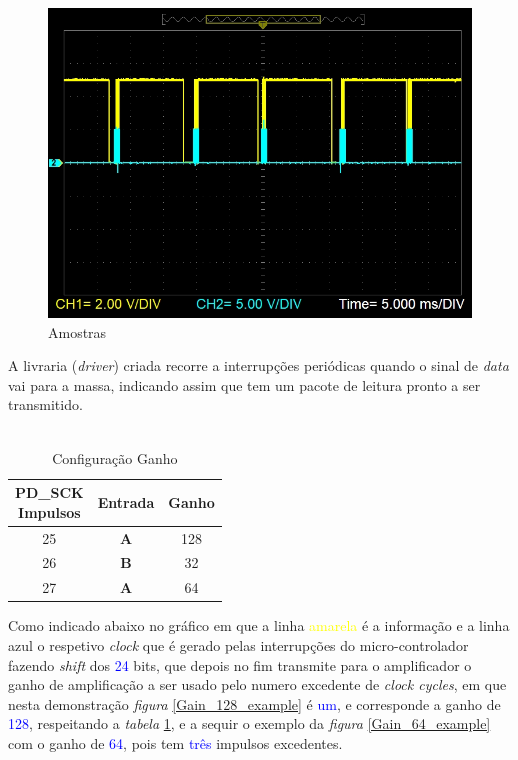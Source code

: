 \begin{figure}[H]
	\centering
	\includegraphics[scale=0.55]{./image/PESTA/graph/80SPS64GAIN/SPS_80.JPG}
	\caption{Amostras}
	\label{SPS_64}
\end{figure}
A livraria (\textit{driver}) criada recorre a interrupções periódicas quando o sinal de \textit{data} vai para a massa, indicando assim que tem um pacote de leitura pronto a ser transmitido.
\\
\\
\begin{minipage}[!b]{.40\linewidth}
	\begin{table}[H]
		\captionsetup{justification=raggedright,singlelinecheck=false}
		\caption{Configuração Ganho}
		\begin{tabular}{ | c | c | c |  }
			\hline
			\makecell[c]{PD\_SCK \\ Impulsos} & Entrada  & Ganho \\
			\hline
			\hline
			25 & \textbf{A} & 128 \\
			\hline
			26 & \textbf{B} & 32 \\
			\hline
			27 & \textbf{A} & 64 \\
			\hline
		\end{tabular}
		\label{Gain_Selection}
	\end{table}
\end{minipage}
\begin{minipage}[l]{.6\linewidth}
\vspace{.3cm}
Como indicado abaixo no gráfico em que a linha \textcolor{yellow}{amarela} é a informação e a linha \textcolor{BlueGreen}{azul} o respetivo \textit{clock} que é gerado pelas interrupções do micro-controlador fazendo \textit{shift} dos \textcolor{blue}{24} bits, que depois no fim transmite para o amplificador o ganho de amplificação a ser usado pelo numero excedente de \textit{clock cycles}, em que nesta demonstração \textit{figura} \ref{Gain_128_example} é \textcolor{blue}{um}, e corresponde a ganho de \textcolor{blue}{128}, respeitando a \textit{tabela} \ref{Gain_Selection},  e a sequir o exemplo da \textit{figura} \ref{Gain_64_example} com o ganho de \textcolor{blue}{64}, pois tem \textcolor{blue}{três} impulsos excedentes.
\\
\end{minipage}
